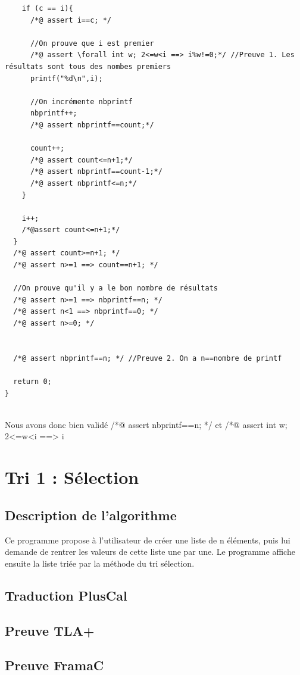 \documentclass{scrreprt}
\begin{document}
\begin{lstlisting}
    if (c == i){
      /*@ assert i==c; */
      
      //On prouve que i est premier
      /*@ assert \forall int w; 2<=w<i ==> i%w!=0;*/ //Preuve 1. Les résultats sont tous des nombes premiers
      printf("%d\n",i);
      
	  //On incrémente nbprintf
	  nbprintf++;
      /*@ assert nbprintf==count;*/
      
      count++;
      /*@ assert count<=n+1;*/
      /*@ assert nbprintf==count-1;*/
      /*@ assert nbprintf<=n;*/
    }
    
    i++;
    /*@assert count<=n+1;*/
  }
  /*@ assert count>=n+1; */
  /*@ assert n>=1 ==> count==n+1; */

  //On prouve qu'il y a le bon nombre de résultats
  /*@ assert n>=1 ==> nbprintf==n; */
  /*@ assert n<1 ==> nbprintf==0; */
  /*@ assert n>=0; */

  
  /*@ assert nbprintf==n; */ //Preuve 2. On a n==nombre de printf
  
  return 0;
}
\end{lstlisting}

\\
Nous avons donc bien validé /*@ assert nbprintf==n; */ et /*@ assert \forall int w; 2<=w<i ==> i%

%
%
%

\chapter{Tri 1 : Sélection}

\section{Description de l'algorithme}
Ce programme propose à l'utilisateur de créer une liste de n éléments, puis lui demande de rentrer les valeurs de cette liste une par une. Le programme affiche ensuite la liste triée par la méthode du tri sélection.

\section{Traduction PlusCal}

\section{Preuve TLA+}

\section{Preuve FramaC}
\end{document}

